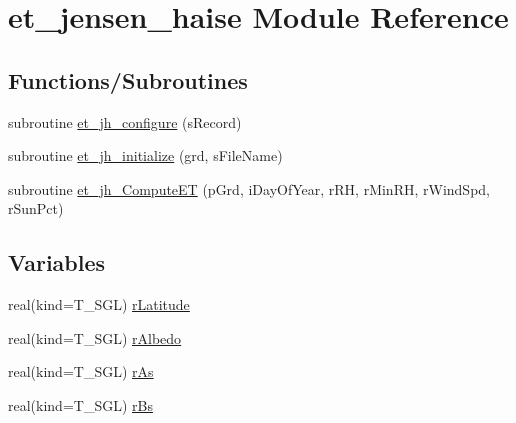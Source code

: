 \hypertarget{namespaceet__jensen__haise}{
\section{et\_\-jensen\_\-haise Module Reference}
\label{namespaceet__jensen__haise}
}
\subsection*{Functions/Subroutines}
\begin{DoxyCompactItemize}
\item 
subroutine \hyperlink{namespaceet__jensen__haise_a4ac0f95d0defb2e2b4f69823a875100e}{et\_\-jh\_\-configure} (sRecord)
\item 
subroutine \hyperlink{namespaceet__jensen__haise_a0c56e8c8b7ba75e1e5bd834699ee5e1f}{et\_\-jh\_\-initialize} (grd, sFileName)
\item 
subroutine \hyperlink{namespaceet__jensen__haise_a5bea6db1809c509d28b93ea3d1f8181e}{et\_\-jh\_\-ComputeET} (pGrd, iDayOfYear, rRH, rMinRH, rWindSpd, rSunPct)
\end{DoxyCompactItemize}
\subsection*{Variables}
\begin{DoxyCompactItemize}
\item 
real(kind=T\_\-SGL) \hyperlink{namespaceet__jensen__haise_af549b1e8ee92983a6b3eddf4c927efcf}{rLatitude}
\item 
real(kind=T\_\-SGL) \hyperlink{namespaceet__jensen__haise_a81532a18aa4ad4afc0670a30833834ac}{rAlbedo}
\item 
real(kind=T\_\-SGL) \hyperlink{namespaceet__jensen__haise_acfcbd3abba7d349d3eaf3ab277d4428e}{rAs}
\item 
real(kind=T\_\-SGL) \hyperlink{namespaceet__jensen__haise_a90836da6e648069d180faaf8d9f66a0e}{rBs}
\end{DoxyCompactItemize}


